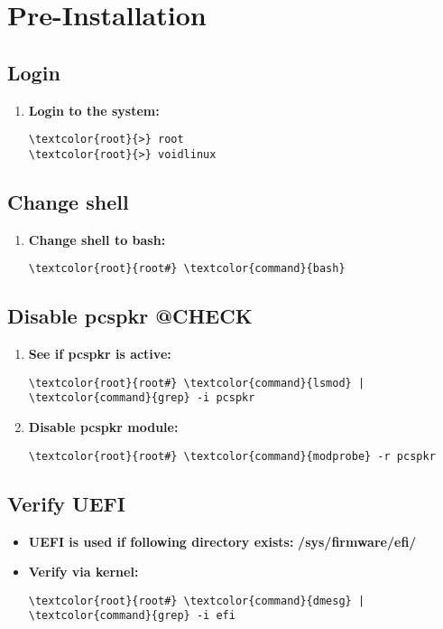 \documentclass[10pt, a4paper, onecolumn, oneside, titlepage, openany]{book}
\begin{document}
\chapter{Pre-Installation}
\section{Login}
\begin{enumerate}
    \item \textbf{Login to the system:}
\begin{Verbatim}[commandchars=\\\{\}]
\textcolor{root}{>} root
\textcolor{root}{>} voidlinux
\end{Verbatim}
\end{enumerate}


\section{Change shell}
\begin{enumerate}
    \item \textbf{Change shell to bash:}
\begin{Verbatim}[commandchars=\\\{\}]
\textcolor{root}{root#} \textcolor{command}{bash}
\end{Verbatim}
\end{enumerate}


\section{Disable pcspkr @CHECK}
\begin{enumerate}
    \item \textbf{See if pcspkr is active:}
\begin{Verbatim}[commandchars=\\\{\}]
\textcolor{root}{root#} \textcolor{command}{lsmod} | \textcolor{command}{grep} -i pcspkr
\end{Verbatim}
    \item \textbf{Disable pcspkr module:}
\begin{Verbatim}[commandchars=\\\{\}]
\textcolor{root}{root#} \textcolor{command}{modprobe} -r pcspkr
\end{Verbatim}
\end{enumerate}


\section{Verify UEFI}
\begin{itemize}
    \item \textbf{UEFI is used if following directory exists:}
\newline \textbf{\textcolor{dir}{/sys/firmware/efi/}}
    \item \textbf{Verify via kernel:}
\begin{Verbatim}[commandchars=\\\{\}]
\textcolor{root}{root#} \textcolor{command}{dmesg} | \textcolor{command}{grep} -i efi
\end{Verbatim}
\end{itemize}
\end{document}
